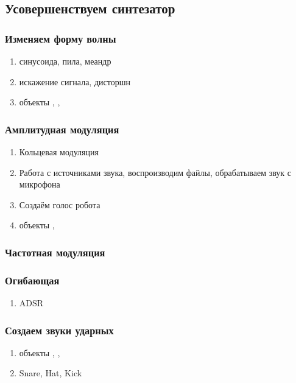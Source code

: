 \documentclass[12pt]{article}
\begin{document}
\subsection{Усовершенствуем синтезатор}

\subsubsection{Изменяем форму волны}
\begin{enumerate}
	\item синусоида, пила, меандр
	\item искажение сигнала, дисторшн
	\item объекты , , 
\end{enumerate}

\subsubsection{Амплитудная модуляция}

\begin{enumerate}
\item Кольцевая модуляция
\item Работа с источниками звука, воспроизводим файлы, обрабатываем звук с микрофона
\item Создаём голос робота
\item объекты , 
\end{enumerate}
	
\subsubsection{Частотная модуляция}



\subsubsection{Огибающая}
\begin{enumerate}
	\item ADSR
\end{enumerate}

\subsubsection{Создаем звуки ударных}
\begin{enumerate}
	\item объекты , , 
	\item Snare, Hat, Kick	
\end{enumerate}
\end{document}
